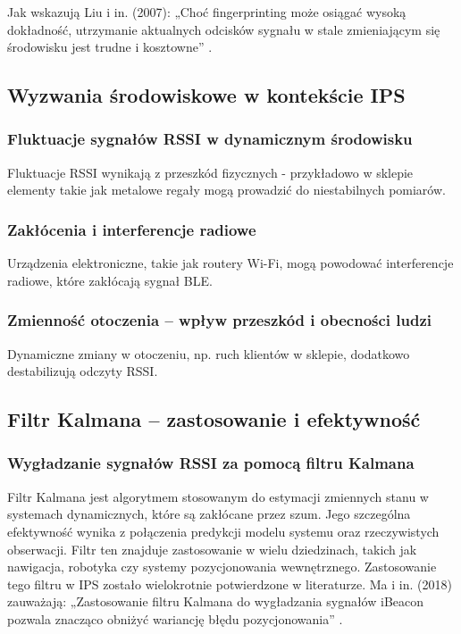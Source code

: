 Jak wskazują Liu i in. (2007): „Choć fingerprinting może osiągać wysoką dokładność, utrzymanie aktualnych odcisków sygnału w stale zmieniającym się środowisku jest trudne i kosztowne” \cite{Liu2007}.

\subsection{Wyzwania środowiskowe w kontekście IPS}

\subsubsection{Fluktuacje sygnałów RSSI w dynamicznym środowisku}
Fluktuacje RSSI wynikają z przeszkód fizycznych - przykładowo w sklepie elementy takie jak metalowe regały mogą prowadzić do niestabilnych pomiarów.

\subsubsection{Zakłócenia i interferencje radiowe}
Urządzenia elektroniczne, takie jak routery Wi-Fi, mogą powodować interferencje radiowe, które zakłócają sygnał BLE.

\subsubsection{Zmienność otoczenia – wpływ przeszkód i obecności ludzi}
Dynamiczne zmiany w otoczeniu, np. ruch klientów w sklepie, dodatkowo destabilizują odczyty RSSI.

\subsection{Filtr Kalmana – zastosowanie i efektywność}

\subsubsection{Wygładzanie sygnałów RSSI za pomocą filtru Kalmana}

Filtr Kalmana jest algorytmem stosowanym do estymacji zmiennych stanu w systemach dynamicznych, które są zakłócane przez szum. Jego szczególna efektywność wynika z połączenia predykcji modelu systemu oraz rzeczywistych obserwacji. Filtr ten znajduje zastosowanie w wielu dziedzinach, takich jak nawigacja, robotyka czy systemy pozycjonowania wewnętrznego. Zastosowanie tego filtru w IPS zostało wielokrotnie potwierdzone w literaturze. Ma i in. (2018) zauważają: „Zastosowanie filtru Kalmana do wygładzania sygnałów iBeacon pozwala znacząco obniżyć wariancję błędu pozycjonowania” \cite{Ma2018}.

